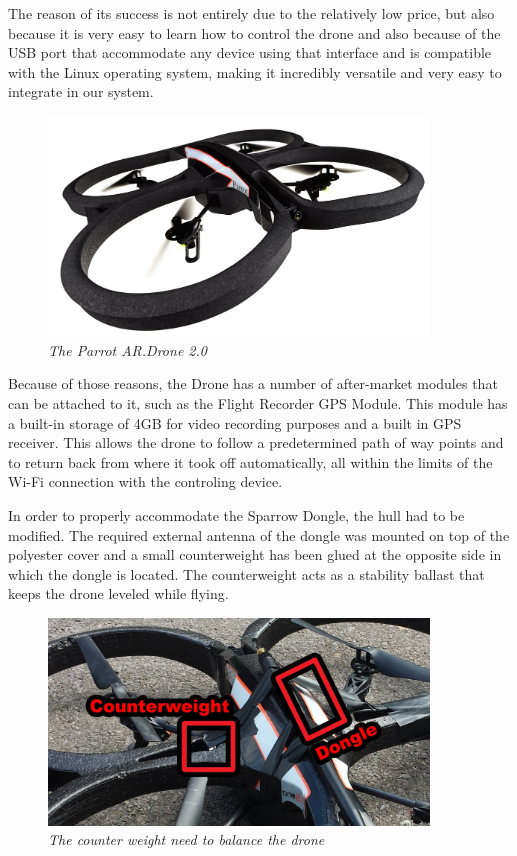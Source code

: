 The reason of its success is not entirely due to the relatively low price, but also because it is very easy to learn how to control the drone and also because of the USB port that accommodate any device using that interface and is compatible with the Linux operating system, making it incredibly versatile and very easy to integrate in our system.


\begin{figure}[ht]
\begin{center}
\includegraphics[width=0.9\textwidth]{img/drone.jpg}
\end{center}
\caption{\small \itshape{The Parrot AR.Drone 2.0}\cite{parrot_drone}}
\end{figure}


Because of those reasons, the Drone has a number of after-market modules that can be attached to it, such as 
the Flight Recorder GPS Module. This module has a built-in storage of 4GB for video recording purposes and a built in GPS receiver. This allows the drone to follow a predetermined path of way points and to return back from where it took off automatically, all within the limits of the Wi-Fi connection with the controling device.

In order to properly accommodate the Sparrow Dongle, the hull had to be modified. The required external antenna of the dongle was mounted on top of the polyester cover and a small counterweight has been glued at the opposite side in which the dongle is located. The counterweight acts as a stability ballast that keeps the drone leveled while flying.


\begin{figure}[ht]
\begin{center}
\includegraphics[width=0.9\textwidth]{img/counterweight.png}
\end{center}
\caption{\small \itshape{The counter weight need to balance the drone}}
\end{figure}

